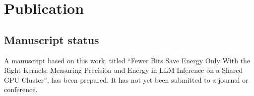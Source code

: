 \chapter{Publication}
\section{Manuscript status}
A manuscript based on this work, titled ``Fewer Bits Save Energy Only With the Right Kernels: Measuring Precision and Energy in LLM Inference on a Shared GPU Cluster'', has been prepared. It has not yet been submitted to a journal or conference.

